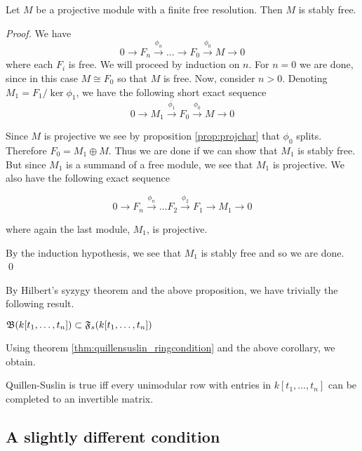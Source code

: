 \begin{proposition}
\label{thm:fgppolyringfree}
  Let $M$ be a projective module with a finite free resolution. Then $M$ is stably free.
\end{proposition}
\begin{proof}
  We have
  \[
    0 \rightarrow F_n \overset{\phi_n} \rightarrow \dots \rightarrow F_0 \overset{\phi_0}\rightarrow M \rightarrow 0
  \]
  where each $F_i$ is free.
  We will proceed by induction on $n$.
  For $n = 0$ we are done, since in this case $M \cong F_0$ so that $M$ is free.
  Now, consider $n > 0$.
  Denoting $M_1 = F_1 / \ker{\phi_1}$, we have the following short exact sequence
  \[
    0 \rightarrow M_1 \overset{\overline{\phi_1}}\rightarrow F_0 \overset{\phi_0}\rightarrow M \rightarrow 0
  \]

  Since $M$ is projective we see by proposition \ref{prop:projchar} that $\phi_0$ splits.
  Therefore $F_0 = M_1 \oplus M$. Thus we are done if we can show that $M_1$ is stably free.
  But since $M_1$ is a summand of a free module, we see that $M_1$ is projective.
  We also have the following exact sequence

  \[
    0 \rightarrow F_n \overset{\phi_n} \rightarrow \dots F_2 \overset{\phi_2}\rightarrow F_1 \rightarrow M_1 \rightarrow 0
  \]

  where again the last module, $M_1$, is projective.

  By the induction hypothesis, we see that $M_1$ is stably free and so we are done.
  \qed
\end{proof}

By Hilbert's syzygy theorem and the above proposition, we have trivially the following result.

\begin{corollary}
\label{cor:fgppolyringstablyfree}
  $\mathfrak B(k[t_1, \dots, t_n]) \subset \mathfrak{F}_s(k[t_1, \dots, t_n])$
\end{corollary}

Using theorem \ref{thm:quillensuslin_ringcondition} and the above corollary, we obtain.

\begin{corollary}\label{cor:quillensuslin_reduced}
  Quillen-Suslin is true iff every unimodular row with entries in $k[t_1,\dots,t_n]$ can be completed
  to an invertible matrix.
\end{corollary}

\subsection{A slightly different condition}
\label{sec:a_slightly_different_condition}

